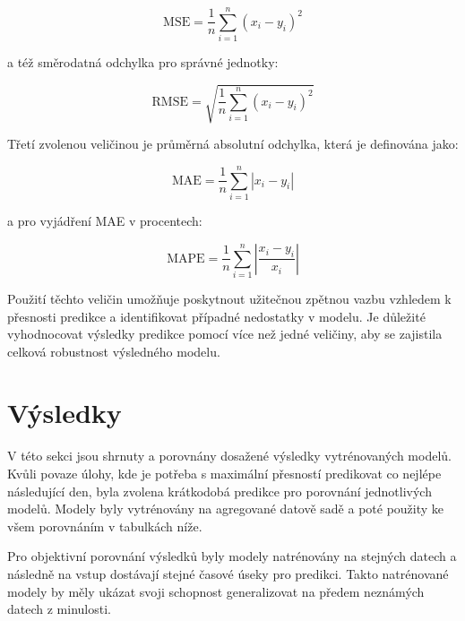 \documentclass[FM,BP,fonts]{tulthesis}
\begin{document}
\begin{equation}
	\text{MSE} = \frac{1}{n}\sum_{i=1}^{n}(x_i-y_i)^2 
\end{equation}

a též směrodatná odchylka pro správné jednotky:

\begin{equation}
	\text{RMSE} = \sqrt{\frac{1}{n}\sum_{i=1}^{n}(x_i-y_i)^2}
\end{equation}

Třetí zvolenou veličinou je průměrná absolutní odchylka, která je definována jako:

\begin{equation}
	\text{MAE} = \frac{1}{n}\sum_{i=1}^{n}|x_i-y_i| 
\end{equation}

a pro vyjádření MAE v procentech: 

\begin{equation}
	\text{MAPE} = \frac{1}{n}\sum_{i=1}^{n}|\frac{x_i-y_i}{x_i}| 
\end{equation}

Použití těchto veličin umožňuje poskytnout užitečnou zpětnou vazbu vzhledem k přesnosti predikce a identifikovat případné nedostatky v modelu. Je důležité vyhodnocovat výsledky predikce pomocí více než jedné veličiny, aby se zajistila celková robustnost výsledného modelu.


\chapter{Výsledky}\label{Výsledky}
V této sekci jsou shrnuty a porovnány dosažené výsledky vytrénovaných modelů. Kvůli povaze úlohy, kde je potřeba s maximální přesností predikovat co nejlépe následující den, byla zvolena krátkodobá predikce pro porovnání jednotlivých modelů. Modely byly vytrénovány na agregované datově sadě a poté použity ke všem porovnáním v tabulkách níže.

Pro objektivní porovnání výsledků byly modely natrénovány na stejných datech a následně na vstup dostávají stejné časové úseky pro predikci. Takto natrénované modely by měly ukázat svoji schopnost generalizovat na předem neznámých datech z minulosti. 
\end{document}
